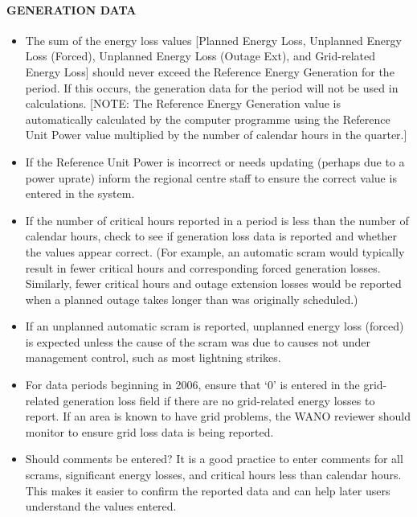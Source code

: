\paragraph{GENERATION DATA}
\begin{itemize}
\item  The sum of the energy loss values [Planned Energy Loss, Unplanned
Energy Loss (Forced), Unplanned Energy Loss (Outage Ext), and
Grid-related Energy Loss] should never exceed the Reference Energy
Generation for the period. If this occurs, the generation
data for the period will not be used in calculations. [NOTE: The
Reference Energy Generation value is automatically calculated by the
computer programme using the Reference Unit Power value multiplied by the number of
calendar hours in the quarter.]
\item If the Reference Unit Power is incorrect or needs updating (perhaps due to
a power uprate) inform the regional centre staff to ensure
the correct value is entered in the system.
\item If the number of critical hours reported in a period is less than the number
of calendar hours, check to see if generation loss data is reported and
whether the values appear correct. (For example, an automatic scram
would typically result in fewer critical hours and corresponding forced
generation losses. Similarly, fewer critical hours and outage extension
losses would be reported when a planned outage takes longer than was
originally scheduled.)
\item If an unplanned automatic scram is reported, unplanned energy loss
(forced) is expected unless the cause of the scram was due to causes not
under management control, such as most lightning strikes.
\item For data periods beginning in 2006, ensure that ‘0’ is entered in the grid-
related generation loss field if there are no grid-related energy losses to
report. If an area is known to have grid problems, the WANO reviewer
should monitor to ensure grid loss data is being reported.
\item Should comments be entered? It is a good practice to enter comments for
all scrams, significant energy losses, and critical hours less than calendar
hours. This makes it easier to confirm the reported data and can help later
users understand the values entered.
\end{itemize}


